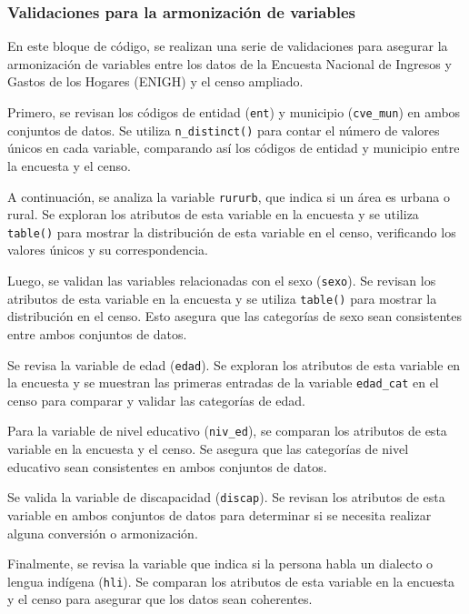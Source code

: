 \documentclass[
  12pt,
]{book}
\begin{document}
\hypertarget{validaciones-para-la-armonizaciuxf3n-de-variables}{%
\subsubsection*{Validaciones para la armonización de variables}\label{validaciones-para-la-armonizaciuxf3n-de-variables}}

En este bloque de código, se realizan una serie de validaciones para asegurar la armonización de variables entre los datos de la Encuesta Nacional de Ingresos y Gastos de los Hogares (ENIGH) y el censo ampliado.

Primero, se revisan los códigos de entidad (\texttt{ent}) y municipio (\texttt{cve\_mun}) en ambos conjuntos de datos. Se utiliza \texttt{n\_distinct()} para contar el número de valores únicos en cada variable, comparando así los códigos de entidad y municipio entre la encuesta y el censo.

A continuación, se analiza la variable \texttt{rururb}, que indica si un área es urbana o rural. Se exploran los atributos de esta variable en la encuesta y se utiliza \texttt{table()} para mostrar la distribución de esta variable en el censo, verificando los valores únicos y su correspondencia.

Luego, se validan las variables relacionadas con el sexo (\texttt{sexo}). Se revisan los atributos de esta variable en la encuesta y se utiliza \texttt{table()} para mostrar la distribución en el censo. Esto asegura que las categorías de sexo sean consistentes entre ambos conjuntos de datos.

Se revisa la variable de edad (\texttt{edad}). Se exploran los atributos de esta variable en la encuesta y se muestran las primeras entradas de la variable \texttt{edad\_cat} en el censo para comparar y validar las categorías de edad.

Para la variable de nivel educativo (\texttt{niv\_ed}), se comparan los atributos de esta variable en la encuesta y el censo. Se asegura que las categorías de nivel educativo sean consistentes en ambos conjuntos de datos.

Se valida la variable de discapacidad (\texttt{discap}). Se revisan los atributos de esta variable en ambos conjuntos de datos para determinar si se necesita realizar alguna conversión o armonización.

Finalmente, se revisa la variable que indica si la persona habla un dialecto o lengua indígena (\texttt{hli}). Se comparan los atributos de esta variable en la encuesta y el censo para asegurar que los datos sean coherentes.
\end{document}
